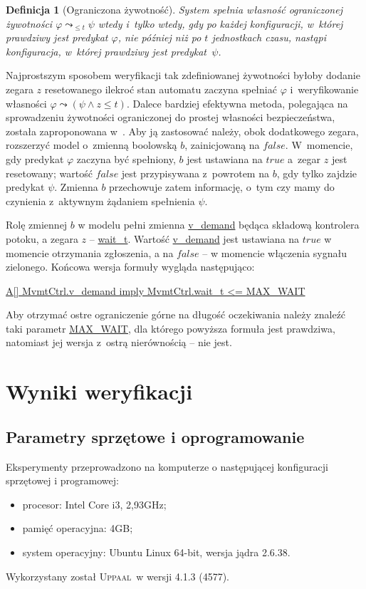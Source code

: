 \documentclass{pracamgr}
\newcommand{\upp}{\textsc{Uppaal}}
\newcommand{\ttt}[1]{\url{#1}}
\newcommand{\tttform}[1]{
  \begin{center}
    \ttt{#1}
  \end{center}
}
\theoremstyle{plain}
\newtheorem{definition}{Definicja}
\begin{document}
\begin{definition}[Ograniczona żywotność]
  System spełnia własność ograniczonej żywotności $\varphi
  \leadsto_{\leq t} \psi $ wtedy i~tylko wtedy, gdy po każdej
  konfiguracji, w~której prawdziwy jest predykat $\varphi$, nie
  później niż po $t$ jednostkach czasu, nastąpi konfiguracja, w~której
  prawdziwy jest predykat~$\psi$.
\end{definition}
Najprostszym sposobem weryfikacji tak zdefiniowanej żywotności byłoby
dodanie zegara $z$ resetowanego ilekroć stan automatu zaczyna
spełniać $\varphi$ i~weryfikowanie własności \mbox{$\varphi \leadsto
  (\psi \land z\leq t)$}. Dalece bardziej efektywna metoda, polegająca
na sprowadzeniu żywotności ograniczonej do prostej własności
bezpieczeństwa, została zaproponowana w~\cite{lpw:tacas98}. Aby ją
zastosować należy, obok dodatkowego zegara, rozszerzyć model o~zmienną
boolowską $b$, zainicjowaną na $false$.  W~momencie, gdy predykat
$\varphi$ zaczyna być spełniony, $b$ jest ustawiana na $true$ a~zegar
$z$ jest resetowany; wartość $false$ jest przypisywana z~powrotem na
$b$, gdy tylko zajdzie predykat $\psi$. Zmienna $b$ przechowuje zatem
informację, o~tym czy mamy do czynienia z~aktywnym żądaniem spełnienia
$\psi$.

Rolę zmiennej $b$ w modelu pełni zmienna \ttt{v_demand} będąca składową
kontrolera potoku, a zegara $z$ -- \ttt{wait_t}. Wartość \ttt{v_demand}
jest ustawiana na $true$ w momencie otrzymania zgłoszenia, a na
$false$ -- w momencie włączenia sygnału zielonego. Końcowa wersja
formuły wygląda następująco:
\tttform{A[] MvmtCtrl.v_demand imply MvmtCtrl.wait_t <= MAX_WAIT}
Aby otrzymać ostre ograniczenie górne na długość oczekiwania należy
znaleźć taki parametr \ttt{MAX_WAIT}, dla którego powyższa formuła
jest prawdziwa, natomiast jej wersja z~ostrą nierównością -- nie jest.

\section{Wyniki weryfikacji}
\label{s:ver:results}
\subsection{Parametry sprzętowe i oprogramowanie}
Eksperymenty przeprowadzono na komputerze o następującej konfiguracji
sprzętowej i programowej:
\begin{itemize}
  \item procesor: Intel Core i3, 2,93GHz;
  \item pamięć operacyjna: 4GB;
  \item system operacyjny: Ubuntu Linux 64-bit, wersja jądra 2.6.38. 
\end{itemize}
Wykorzystany został \upp\ w wersji 4.1.3 (4577).
\end{document}
